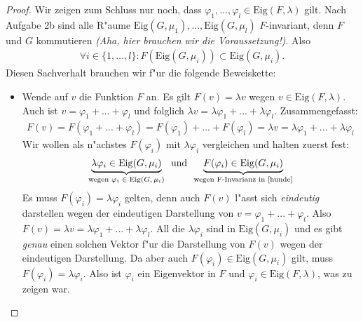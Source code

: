 \documentclass[a4paper,fontsize=12pt]{article}
\theoremstyle{plain}
\begin{document}
\begin{proof}
    Wir zeigen zum Schluss nur noch, dass $\varphi_1,...,\varphi_l \in \mathrm{Eig}(F,\lambda)$ gilt. Nach Aufgabe 2b sind alle R"aume $\mathrm{Eig}(G,\mu_1), ..., \mathrm{Eig}(G,\mu_l)$ $F$-invariant, denn $F$ und $G$ kommutieren \textit{(Aha, hier brauchen wir die Voraussetzung!)}. Also
    \begin{align}\label{hunde}
        \forall i \in \{1,...,l\}: F(\mathrm{Eig}(G,\mu_i)) \subset \mathrm{Eig}(G,\mu_i).
    \end{align}
    Diesen Sachverhalt brauchen wir f"ur die folgende Beweiskette:
    \begin{itemize}
        \item Wende auf $v$ die Funktion $F$ an. Es gilt $F(v) = \lambda v$  wegen $v \in \mathrm{Eig}(F,\lambda)$. Auch ist $v = \varphi_1+...+\varphi_l$ und folglich $\lambda v = \lambda \varphi_1+...+\lambda \varphi_l$. Zusammengefasst:
        \begin{align*}
            F(v) = F(\varphi_1+...+\varphi_l) = F(\varphi_1) +...+F(\varphi_l) = \lambda v  = \lambda \varphi_1+...+\lambda \varphi_l 
        \end{align*}
        Wir wollen als n"achstes $F(\varphi_i)$ mit $\lambda \varphi_i$ vergleichen und halten zuerst fest:
        \[
            \underbrace{\lambda \varphi_i \in \mathrm{Eig}(G,\mu_i)}_{\text{wegen $\varphi_i \in \mathrm{Eig}(G,\mu_i)$}} \, \text{ und } \, \underbrace{F(\varphi_i) \in \mathrm{Eig}(G,\mu_i)}_{\text{wegen F-Invarianz in \eqref{hunde}}} 
        \]
        Es muss $F(\varphi_i) = \lambda \varphi_i$ gelten, denn auch $F(v)$ l"asst sich \emph{eindeutig} darstellen wegen der eindeutigen Darstellung von $v = \varphi_1 + ... + \varphi_l$. Also $F(v) = \lambda v = \lambda \varphi_1 + ... + \lambda \varphi_l$. All die $\lambda \varphi_i$ sind in $\mathrm{Eig}(G,\mu_i)$ und es gibt \emph{genau} einen solchen Vektor f"ur die Darstellung von $F(v)$ wegen der eindeutigen Darstellung. Da aber auch $F(\varphi_i) \in \mathrm{Eig}(G,\mu_i)$ gilt, muss $F(\varphi_i) = \lambda \varphi_i$. Also ist $\varphi_i$ ein Eigenvektor in $F$ und $\varphi_i \in \mathrm{Eig}(F,\lambda)$, was zu zeigen war.
    \end{itemize}
\end{proof}
\end{document}
